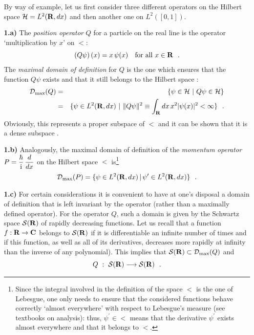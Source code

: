 \documentclass[a4wide,12pt]{report}
\begin{document}
By way of example, let us first consider 
three different operators on the Hilbert space ${\cal H} ={L^2 ({{\bf R}},dx)}$ 
and then another one on $L^2([0,1])$. 

\medskip 
\noindent
{\bf 1.a)}
The {\em position operator} $Q$ for a particle 
on the real line 
is the operator 
`multiplication by $x$'
on $\lt$:
\begin{equation}
\label{pos}
\left(Q \psi \right) (x) = x \, \psi (x)
\quad  \mbox{for all $x\in {\bf R}$}
\ \ .
\end{equation}
The {\em maximal domain of definition} for $Q$ is 
the one which ensures that the function 
$Q\psi$ exists and that it still belongs to the Hilbert
space : 
\begin{eqnarray}
{\cal D}_{\rm max} (Q) 
&=& \{ \psi \in {\cal H} \ | \ Q\psi \in {\cal H} \}
\nonumber 
\\
\label{dq}
&=& \{ \psi \in {L^2 ({{\bf R}},dx)} \ | \
\| Q \psi \|^2 \equiv \int_{{\bf R}}dx \, x^2 | \psi (x) |^2
< \infty \}
\ \ .
\end{eqnarray}
Obviously, this represents a proper subspace of $\lt$ and it can 
be shown that it is a dense subspace \cite{sg,rs}.  

\medskip 
\noindent
{\bf 1.b)}
Analogously, 
the maximal domain of definition of the {\em momentum operator} 
$P= \displaystyle{\hbar \over {\rm i}} \, \displaystyle{d \over dx}$ 
on the Hilbert space $\lt$
is\footnote{Since the integral involved in the definition of the space 
$\lt$ is the one of 
Lebesgue, one only needs to ensure that the considered functions 
behave correctly `almost everywhere' with respect to Lebesgue's
measure (see textbooks on analysis): 
thus, $\psi^{\prime} \in \lt$ means that the derivative 
$\psi^{\prime}$ exists almost everywhere and that it belongs to 
$\lt$.}
\[
{\cal D}_{\rm max} (P) = \{ \psi \in {L^2 ({{\bf R}},dx)} \, | \,
\psi^{\prime} \in {L^2 ({{\bf R}},dx)} \}
\ \ .
\]

\medskip 
\noindent
{\bf 1.c)}
For certain considerations it is convenient to 
have at one's disposal 
a domain of definition that is left invariant by the operator
(rather than a maximally defined operator).   
For the operator $Q$, such a domain is given by the Schwartz space 
${\cal S}({\bf R})$ of rapidly decreasing functions. 
Let us recall that a function $f : {\bf R} \to {\bf C}$ belongs to ${\cal S}({\bf R})$
if it is differentiable an infinite number of times and if this function,  
as well as all of its derivatives, 
decreases more rapidly at infinity than  
the inverse of any polynomial). This implies that 
${\cal S}({\bf R}) \subset {\cal D}_{\rm max} (Q)$ and 
\begin{equation}
\label{qsc}
Q \ : \ {\cal S}({\bf R}) \longrightarrow {\cal S}({\bf R})
\ \ .
\end{equation}
\end{document}
